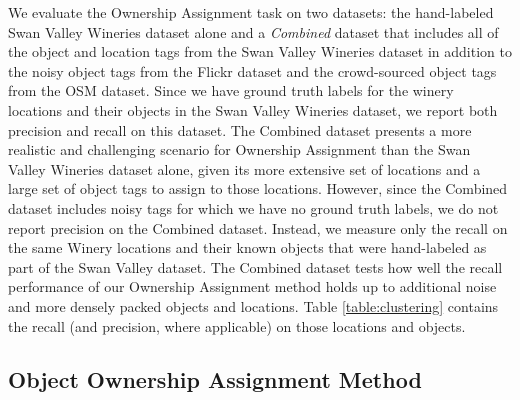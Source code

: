 We evaluate the Ownership Assignment task on two datasets: the hand-labeled Swan Valley Wineries dataset alone and a \textit{Combined} dataset that includes all of the object and location tags from the Swan Valley Wineries dataset in addition to the noisy object tags from the Flickr dataset and the crowd-sourced object tags from the OSM dataset.
Since we have ground truth labels for the winery locations and their objects in the Swan Valley Wineries dataset, we report both precision and recall on this dataset.
The Combined dataset presents a more realistic and challenging scenario for Ownership Assignment than the Swan Valley Wineries dataset alone, given its more extensive set of locations and a large set of object tags to assign to those locations. However, since the Combined dataset includes noisy tags for which we have no ground truth labels, we do not report precision on the Combined dataset. Instead, we measure only the recall on the same Winery locations and their known objects that were hand-labeled as part of the Swan Valley dataset. The Combined dataset tests how well the recall performance of our Ownership Assignment method holds up to additional noise and more densely packed objects and locations.
Table \ref{table:clustering} contains the recall (and precision, where applicable) on those locations and objects.

\subsection{Object Ownership Assignment Method}

